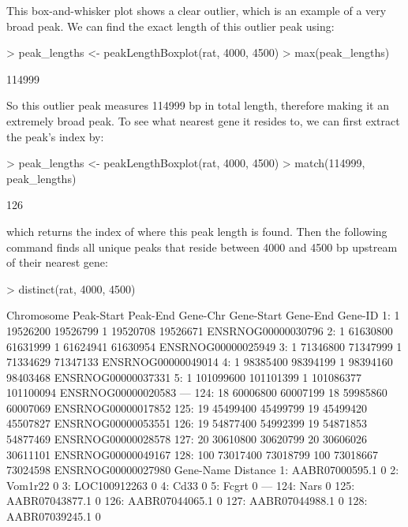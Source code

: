 \documentclass[12pt]{article}
\begin{document}
This box-and-whisker plot shows a clear outlier, which is an example of a very broad peak.  We can find the exact length of this outlier peak using: 

\begin{Schunk}
\begin{Sinput}
> peak_lengths <- peakLengthBoxplot(rat, 4000, 4500)
> max(peak_lengths)
\end{Sinput}
\begin{Soutput}
[1] 114999
\end{Soutput}
\end{Schunk}

So this outlier peak measures 114999 bp in total length, therefore making it an extremely broad peak.  To see what nearest gene it resides to, we can first extract the peak's index by:

\begin{Schunk}
\begin{Sinput}
> peak_lengths <- peakLengthBoxplot(rat, 4000, 4500)
> match(114999, peak_lengths)
\end{Sinput}
\begin{Soutput}
[1] 126
\end{Soutput}
\end{Schunk}

which returns the index of where this peak length is found.  Then the following command finds all unique peaks that reside between 4000 and 4500 bp upstream of their nearest gene:

\begin{Schunk}
\begin{Sinput}
> distinct(rat, 4000, 4500)
\end{Sinput}
\begin{Soutput}
     Chromosome Peak-Start  Peak-End Gene-Chr Gene-Start  Gene-End            Gene-ID
  1:          1   19526200  19526799        1   19520708  19526671 ENSRNOG00000030796
  2:          1   61630800  61631999        1   61624941  61630954 ENSRNOG00000025949
  3:          1   71346800  71347999        1   71334629  71347133 ENSRNOG00000049014
  4:          1   98385400  98394199        1   98394160  98403468 ENSRNOG00000037331
  5:          1  101099600 101101399        1  101086377 101100094 ENSRNOG00000020583
 ---                                                                                 
124:         18   60006800  60007199       18   59985860  60007069 ENSRNOG00000017852
125:         19   45499400  45499799       19   45499420  45507827 ENSRNOG00000053551
126:         19   54877400  54992399       19   54871853  54877469 ENSRNOG00000028578
127:         20   30610800  30620799       20   30606026  30611101 ENSRNOG00000049167
128:        100   73017400  73018799      100   73018667  73024598 ENSRNOG00000027980
          Gene-Name Distance
  1: AABR07000595.1        0
  2:        Vom1r22        0
  3:   LOC100912263        0
  4:           Cd33        0
  5:          Fcgrt        0
 ---                        
124:           Nars        0
125: AABR07043877.1        0
126: AABR07044065.1        0
127: AABR07044988.1        0
128: AABR07039245.1        0
\end{Soutput}
\end{Schunk}
\end{document}

